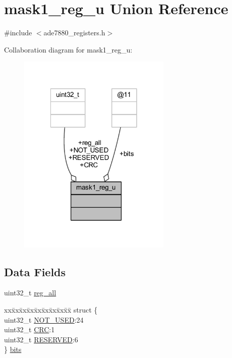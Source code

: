 \hypertarget{a00028}{\section{mask1\-\_\-reg\-\_\-u Union Reference}
\label{dc/d3c/a00028}
}


{\ttfamily \#include $<$ade7880\-\_\-registers.\-h$>$}



Collaboration diagram for mask1\-\_\-reg\-\_\-u\-:\nopagebreak
\begin{figure}[H]
\begin{center}
\leavevmode
\includegraphics[width=207pt]{d1/dc1/a00092}
\end{center}
\end{figure}
\subsection*{Data Fields}
\begin{DoxyCompactItemize}
\item 
uint32\-\_\-t \hyperlink{a00028_ae44a0232a79ff51b5ef7aa80e4b35470}{reg\-\_\-all}
\item 
\begin{tabbing}
xx\=xx\=xx\=xx\=xx\=xx\=xx\=xx\=xx\=\kill
struct \{\\
\>uint32\_t \hyperlink{a00028_aa979856ee90a694e453f80dde4e52bc7}{NOT\_USED}:24\\
\>uint32\_t \hyperlink{a00028_ac47eb69b8f92811cf4ab6f12a84e0f4c}{CRC}:1\\
\>uint32\_t \hyperlink{a00028_a0e5030971ec1bfd3101f83f546493c83}{RESERVED}:6\\
\} \hyperlink{a00028_aa63013e67d51c4116401cb5b64e9b4fb}{bits}\\

\end{tabbing}\end{DoxyCompactItemize}


